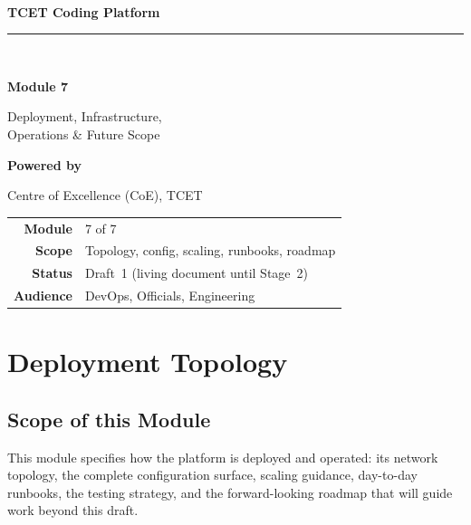 \documentclass[12pt,a4paper,oneside]{report}
\begin{document}
\begin{titlepage}\centering
\vspace*{1.4cm}{\color{tcetaccent}\rule{\linewidth}{1.2pt}}\\[0.5cm]
{\LARGE\bfseries TCET Coding Platform\par}
{\color{tcetaccent}\rule{\linewidth}{1.2pt}}\\[1.4cm]
{\Huge\bfseries\color{tcetblue} Module 7\par}\vspace{0.3cm}
{\Huge Deployment, Infrastructure,\\[0.2cm] Operations \& Future Scope\par}\vspace{2.0cm}
{\large\bfseries Powered by\par}{\Large\color{tcetblue} Centre of Excellence (CoE), TCET\par}\vfill
\begin{tabular}{rl}\textbf{Module} & 7 of 7\\[3pt]
\textbf{Scope} & Topology, config, scaling, runbooks, roadmap\\[3pt]
\textbf{Status} & Draft~1 (living document until Stage~2)\\[3pt]
\textbf{Audience} & DevOps, Officials, Engineering\\\end{tabular}
\vspace{0.8cm}{\small\itshape \today\par}\end{titlepage}
\tableofcontents\clearpage{}

\chapter{Deployment Topology}
\section{Scope of this Module}
This module specifies how the platform is deployed and operated: its network
topology, the complete configuration surface, scaling guidance, day-to-day
runbooks, the testing strategy, and the forward-looking roadmap that will guide
work beyond this draft.
\end{document}
